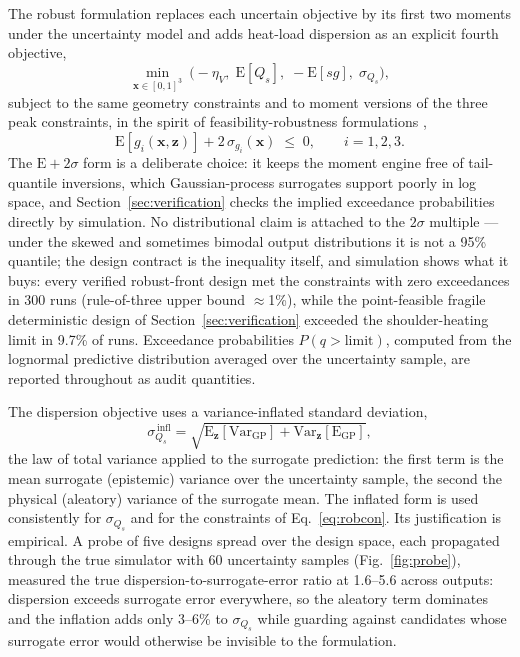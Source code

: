 The robust formulation replaces each uncertain objective by its first two
moments under the uncertainty model and adds heat-load dispersion as an
explicit fourth objective,
\begin{equation}
\min_{\mathbf{x}\in[0,1]^3}\ \bigl(-\eta_V,\; \mathrm{E}[Q_s],\;
  -\mathrm{E}[sg],\; \sigma_{Q_s}\bigr),
\label{eq:rob}
\end{equation}
subject to the same geometry constraints and to moment versions of the three
peak constraints, in the spirit of feasibility-robustness formulations
\cite{du2000robust},
\begin{equation}
\mathrm{E}[g_i(\mathbf{x},\mathbf{z})] + 2\,\sigma_{g_i}(\mathbf{x})
  \;\le\; 0 , \qquad i=1,2,3 .
\label{eq:robcon}
\end{equation}
The $\mathrm{E}+2\sigma$ form is a deliberate choice: it keeps the moment
engine free of tail-quantile inversions, which Gaussian-process surrogates
support poorly in log space, and Section~\ref{sec:verification} checks the
implied exceedance probabilities directly by simulation. No distributional
claim is attached to the $2\sigma$ multiple --- under the skewed and
sometimes bimodal output distributions it is not a 95\% quantile; the
design contract is the inequality itself, and simulation shows what it
buys: every verified robust-front design met the constraints with zero
exceedances in 300 runs (rule-of-three upper bound $\approx$1\%), while
the point-feasible fragile deterministic design of
Section~\ref{sec:verification} exceeded the shoulder-heating limit in
9.7\% of runs. Exceedance
probabilities $P(q>\text{limit})$, computed from the lognormal predictive
distribution averaged over the uncertainty sample, are reported throughout
as audit quantities.

The dispersion objective uses a variance-inflated standard deviation,
\begin{equation}
\sigma_{Q_s}^{\,\mathrm{infl}} = \sqrt{
  \mathrm{E}_{\mathbf{z}}\!\left[\mathrm{Var}_{\mathrm{GP}}\right] +
  \mathrm{Var}_{\mathbf{z}}\!\left[\mathrm{E}_{\mathrm{GP}}\right]},
\label{eq:infl}
\end{equation}
the law of total variance applied to the surrogate prediction: the first
term is the mean surrogate (epistemic) variance over the uncertainty sample,
the second the physical (aleatory) variance of the surrogate mean. The
inflated form is used consistently for $\sigma_{Q_s}$ and for the
constraints of Eq.~\eqref{eq:robcon}. Its justification is empirical. A
probe of five designs spread over the design space, each propagated through
the true simulator with 60 uncertainty samples (Fig.~\ref{fig:probe}),
measured the true dispersion-to-surrogate-error ratio at 1.6--5.6 across
outputs: dispersion exceeds surrogate error everywhere, so the aleatory term
dominates and the inflation adds only 3--6\% to $\sigma_{Q_s}$ while
guarding against candidates whose surrogate error would otherwise be
invisible to the formulation.

